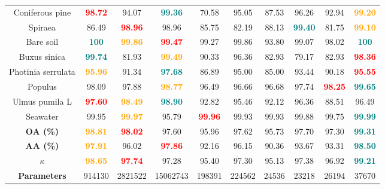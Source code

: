 \begin{table}[!hbt]
{\begin{tabular}{c|cccccccc|c}
        Coniferous pine & \textcolor{red}{\textbf{98.72}} & 94.07 & \textcolor{teal}{\textbf{99.36}} & 70.58  & 95.05 & 87.53 & 96.26 & 92.94 & \textcolor{orange}{\textbf{99.20}} \\ 
        Spiraea   & 86.49 &\textcolor{red}{\textbf{98.96}} & 98.96 & 85.75  & 82.19 & 88.13 & \textcolor{teal}{\textbf{99.40}} & 81.75 & \textcolor{orange}{\textbf{99.10}} \\ 
        Bare soil  & \textcolor{teal}{\textbf{100}} & \textcolor{orange}{\textbf{99.86}} & \textcolor{red}{\textbf{99.47}} & 99.27  & 99.86 & 93.80 & 99.07 & 98.02 &\textcolor{teal}{\textbf{100}} \\ 
        Buxus sinica  & \textcolor{teal}{\textbf{99.74}} & 81.93 &\textcolor{orange}{\textbf{99.49}} & 90.33  & 96.36 & 82.93 & 79.17 & 82.93 & \textcolor{red}{\textbf{98.36}} \\ 
        Photinia serrulata  & \textcolor{orange}{\textbf{95.96}} & 91.34 & \textcolor{teal}{\textbf{97.68}} & 86.89 & 95.00 & 85.00 & 93.44 & 90.18 & \textcolor{red}{\textbf{95.55}} \\  
        Populus & 98.09 & 97.88 & \textcolor{orange}{\textbf{98.77}} & 96.49  & 96.66 & 96.68 & 97.74 & \textcolor{red}{\textbf{98.25}} & \textcolor{teal}{\textbf{99.65}} \\ 
        Ulmus pumila L   & \textcolor{red}{\textbf{97.60}} & \textcolor{orange}{\textbf{98.49}} & \textcolor{teal}{\textbf{98.90}} & 92.82 & 95.46 & 92.12 & 96.36 & 88.51 &96.49 \\ 
        Seawater & 99.95 &\textcolor{orange}{\textbf{99.97}}  & 95.79 & \textcolor{red}{\textbf{99.96}} & 99.93 & 99.93 & 99.88 & 99.75 & \textcolor{teal}{\textbf{99.99}} \\ \hline
        
        \textbf{OA (\%)}      & \textcolor{orange}{\textbf{98.81}} & \textcolor{red}{\textbf{ 98.02}} & 97.60 & 95.96 & 97.62 & 95.73 & 97.70 & 97.30 & \textcolor{teal}{\textbf{99.31}} \\ 
        \textbf{AA (\%)}     & \textcolor{orange}{\textbf{97.91}} & 96.02  &  \textcolor{red}{\textbf{97.86}} & 92.16  & 96.15 & 90.36 & 93.67 & 93.31 & \textcolor{teal}{\textbf{98.50}} \\ 
        \textbf{$\kappa$}    & \textcolor{orange}{\textbf{98.65}} &  \textcolor{red}{\textbf{97.74}} & 97.28 & 95.40  & 97.30 & 95.13 & 97.38 & 96.92 & \textcolor{teal}{\textbf{99.21}} \\\hline
        
        \textbf{Parameters} & \num{914130}  &\num{2821522} & \num{15062743} & \num{198391}  & \num{224562} & \num{24536} & \num{23218} & \num{26194} & \num{37670} \\ \hline
    \end{tabular}}
    \label{tab:TH}
\end{table}


